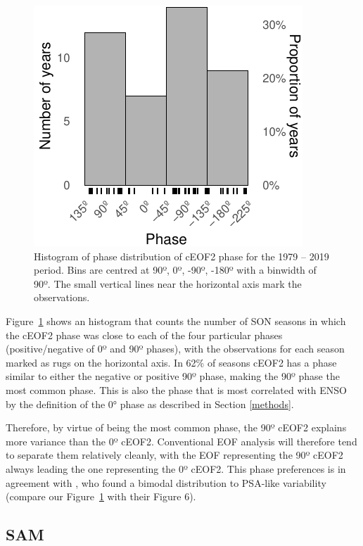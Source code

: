 \documentclass[pdflatex,sn-basic]{sn-jnl}
\theoremstyle{thmstyleone}%
\theoremstyle{thmstyletwo}%
\theoremstyle{thmstylethree}%
\begin{document}
\begin{figure}
\centering
\includegraphics{../figures/phase-histogram-1.pdf}
\caption{\label{fig:phase-histogram}Histogram of phase distribution of cEOF2 phase for the 1979 -- 2019 period. Bins are centred at 90º, 0º, -90º, -180º with a binwidth of 90º. The small vertical lines near the horizontal axis mark the observations.}
\end{figure}

Figure~\ref{fig:phase-histogram} shows an histogram that counts the number of SON seasons in which the cEOF2 phase was close to each of the four particular phases (positive/negative of 0º and 90º phases), with the observations for each season marked as rugs on the horizontal axis.
In 62\% of seasons cEOF2 has a phase similar to either the negative or positive 90º phase, making the 90º phase the most common phase.
This is also the phase that is most correlated with ENSO by the definition of the 0° phase as described in Section \ref{methods}.~

Therefore, by virtue of being the most common phase, the 90º cEOF2 explains more variance than the 0º cEOF2.
Conventional EOF analysis will therefore tend to separate them relatively cleanly, with the EOF representing the 90º cEOF2 always leading the one representing the 0º cEOF2.
This phase preferences is in agreement with \citet{irving2016}, who found a bimodal distribution to PSA-like variability (compare our Figure~\ref{fig:phase-histogram} with their Figure 6).

\hypertarget{sam}{%
\subsection{SAM}\label{sam}}
\end{document}
